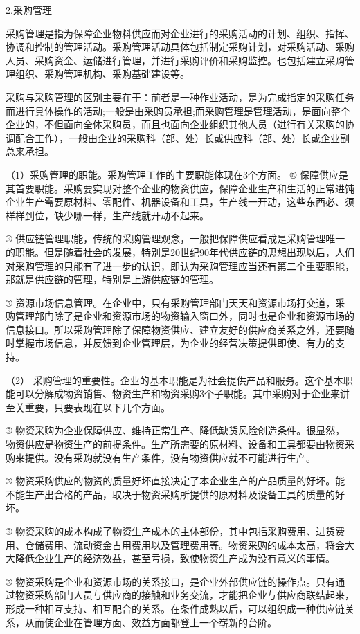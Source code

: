 2.采购管理

    采购管理是指为保障企业物料供应而对企业进行的采购活动的计划、组织、指挥、协调和控制的管理活动。采购管理活动具体包括制定采购计划，对采购活动、采购人员、采购资金、运储进行管理，并进行采购评价和采购监控。也包括建立采购管理组织、采购管理机构、采购基础建设等。

    采购与采购管理的区别主要在于：前者是一种作业活动，是为完成指定的采购任务而进行具体操作的活动;一般是由采购员承担;而采购管理是管理活动，是面向整个企业的，不但面向全体采购员，而且也面向企业组织其他人员（进行有关采购的协调配合工作），一般由企业的采购科（部、处）长或供应科（部、处）长或企业副总来承担。


    （1）采购管理的职能。采购管理工作的主要职能体现在3个方面。
    ® 保障供应是其首要职能。采购要实现对整个企业的物资供应，保障企业生产和生活的正常进饨企业生产需要原材料、零配件、机器设备和工具，生产线一开动，这些东西必、须样样到位，缺少哪一样，生产线就开动不起来。

    ® 供应链管理职能，传统的采购管理观念，一般把保障供应看成是采购管理唯一的职能。但是随着社会的发展，特别是20世纪90年代供应链的思想出现以后，人们对采购管理的只能有了进一步的认识，即认为采购管理应当还有第二个重要职能，那就是供应链的管理，特别是上游供应链的管理。

    ® 资源市场信息管理。在企业中，只有采购管理部门天天和资源市场打交道，采购管理部门除了是企业和资源市场的物资输入窗口外，同时也是企业和资源市场的信息接口。所以采购管理除了保障物资供应、建立友好的供应商关系之外，还要随时掌握市场信息，并反馈到企业管理层，为企业的经营决策提供即使、有力的支持。

    （2） 采购管理的重要性。企业的基本职能是为社会提供产品和服务。这个基本职能可以分解成物资销售、物资生产和物资采购3个子职能。其中采购对于企业来讲至关重要，只要表现在以下几个方面。

    ® 物资采购为企业保障供应、维持正常生产、降低缺货风险创造条件。很显然，物资供应是物资生产的前提条件。生产所需要的原材料、设备和工具都要由物资采购来提供。没有采购就没有生产条件，没有物资供应就不可能进行生产。

    ® 物资采购供应的物资的质量好坏直接决定了本企业生产的产品质量的好坏。能不能生产出合格的产品，取决于物资采购所提供的原材料及设备工具的质量的好坏。

    ® 物资采购的成本构成了物资生产成本的主体部份，其中包括采购费用、进货费用、仓储费用、流动资金占用费用以及管理费用等。物资采购的成本太高，将会大大降低企业生产的经济效益，甚至亏损，致使物资生产成为没有意义的事情。

    ® 物资采购是企业和资源市场的关系接口，是企业外部供应链的操作点。只有通过物资采购部门人员与供应商的接触和业务交流，才能把企业与供应商联结起来，形成一种相互支持、相互配合的关系。在条件成熟以后，可以组织成一种供应链关系，从而使企业在管理方面、效益方面都登上一个崭新的台阶。

